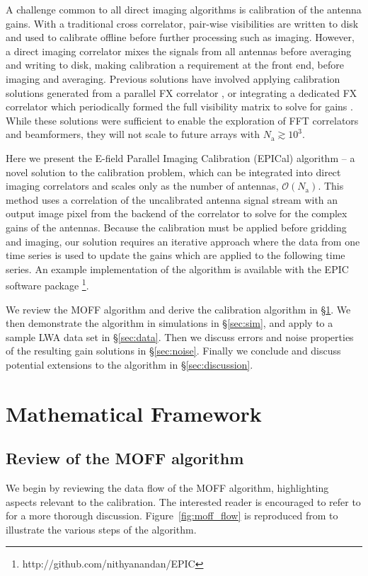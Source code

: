 \documentclass[a4paper,fleqn,usenatbib]{mnras}
\newcommand{\Nant}{\ensuremath{N_{\mathrm{a}}}}
\begin{document}
A challenge common to all direct imaging algorithms is calibration of the antenna gains. With a 
traditional cross correlator, pair-wise visibilities are written to disk and used to calibrate 
offline before further processing such as imaging. However, a direct imaging correlator mixes 
the signals from all antennas before averaging and writing to disk, making calibration a 
requirement at the front end, before imaging and averaging. Previous solutions have involved 
applying calibration solutions generated from a parallel FX correlator \citep{zhe14, fos14}, or 
integrating a dedicated FX correlator which periodically formed the full visibility matrix to solve 
for gains \citep{wij09,dev09}. While these solutions were sufficient to enable the exploration of 
FFT correlators and beamformers, they will not scale to future arrays with $\Nant \gtrsim 10^3$.

Here we present the E-field Parallel Imaging Calibration (EPICal) algorithm -- a novel solution 
to the calibration problem, which can be integrated into direct imaging correlators and scales 
only as the number of antennas, $\mathcal{O}(\Nant)$. This method uses a correlation of the 
uncalibrated antenna signal stream with an output image pixel from the backend of the 
correlator to solve for the complex gains of the antennas. Because the calibration must be 
applied before gridding and imaging, our solution requires an iterative approach where the data 
from one time series is used to update the gains which are applied to the following time series. 
An example implementation of the algorithm is available with the EPIC software package
\footnote{http://github.com/nithyanandan/EPIC}.

We review the MOFF algorithm and derive the calibration algorithm in \S \ref{sec:math}. We 
then demonstrate the algorithm in simulations in \S \ref{sec:sim}, and apply to a sample LWA 
data set in \S \ref{sec:data}. Then we discuss errors and noise properties of the resulting gain 
solutions in \S \ref{sec:noise}. Finally we conclude and discuss potential extensions to the 
algorithm in \S \ref{sec:discussion}.

\section{Mathematical Framework}\label{sec:math}
\subsection{Review of the MOFF algorithm}
We begin by reviewing the data flow of the MOFF algorithm, highlighting aspects relevant to 
the calibration. The interested reader is encouraged to refer to \citealt{mor11} for a more 
thorough discussion. Figure~\ref{fig:moff_flow} is reproduced from \citealt{thy15c} to illustrate 
the various steps of the algorithm.
\end{document}
